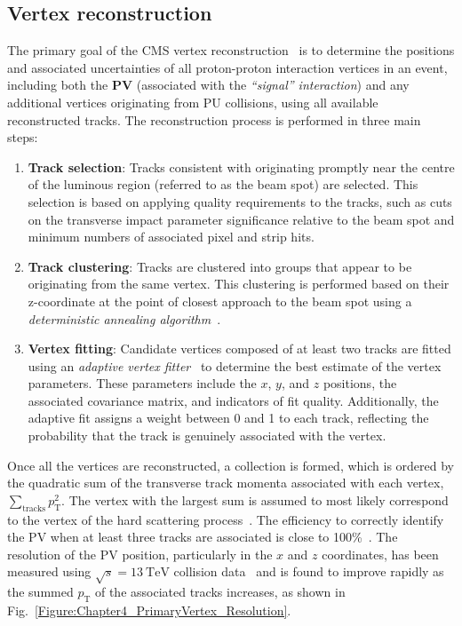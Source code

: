 \subsection{Vertex reconstruction}

The primary goal of the CMS vertex reconstruction~\cite{CMS_TrackerPerformance_2014} is to determine the positions and associated uncertainties of all proton-proton interaction vertices in an event, including both the \textbf{\ac{PV}} (associated with the \textit{``signal'' interaction}) and any additional vertices originating from PU collisions, using all available reconstructed tracks. The reconstruction process is performed in three main steps: 

\begin{enumerate}
    \item \textbf{Track selection}: Tracks consistent with originating promptly near the centre of the luminous region (referred to as the beam spot) are selected. This selection is based on applying quality requirements to the tracks, such as cuts on the transverse impact parameter significance relative to the beam spot and minimum numbers of associated pixel and strip hits.
    \item \textbf{Track clustering}: Tracks are clustered into groups that appear to be originating from the same vertex. This clustering is performed based on their z-coordinate at the point of closest approach to the beam spot using a \textit{deterministic annealing algorithm}~\cite{DeterministicAnnealing}.
    \item \textbf{Vertex fitting}: Candidate vertices composed of at least two tracks are fitted using an \textit{adaptive vertex fitter}~\cite{VertexFitting_2006,VertexFitting_2007} to determine the best estimate of the vertex parameters. These parameters include the $x$, $y$, and $z$ positions, the associated covariance matrix, and indicators of fit quality. Additionally, the adaptive fit assigns a weight between 0 and 1 to each track, reflecting the probability that the track is genuinely associated with the vertex.
\end{enumerate}

Once all the vertices are reconstructed, a collection is formed, which is ordered by the quadratic sum of the transverse track momenta associated with each vertex, $\sum_{\text{tracks}} p_{\mathrm{T}}^2$. The vertex with the largest sum is assumed to most likely correspond to the vertex of the hard scattering process~\cite{ParticleFlow}. The efficiency to correctly identify the PV when at least three tracks are associated is close to 100\%~\cite{CMS_TrackerPerformance_2014}. The resolution of the PV position, particularly in the $x$ and $z$ coordinates, has been measured using $\sqrt{s} = 13\ \mathrm{TeV}$ collision data~\cite{PrimaryVertex_Resolution} and is found to improve rapidly as the summed $p_{\mathrm{T}}$ of the associated tracks increases, as shown in Fig.~\ref{Figure:Chapter4_PrimaryVertex_Resolution}.

